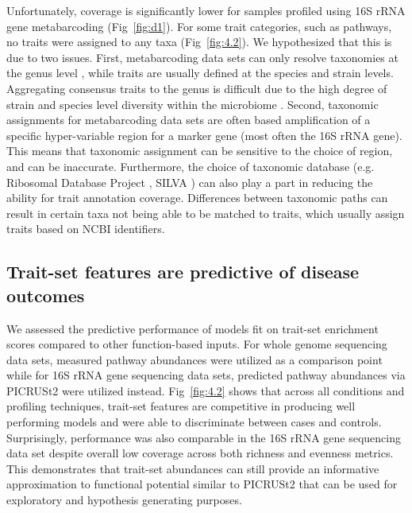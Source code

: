 Unfortunately, coverage is significantly lower for samples profiled using 16S rRNA gene metabarcoding (Fig~\ref{fig:d1}). For some trait categories, such as pathways, no traits were assigned to any taxa (Fig~\ref{fig:4.2}). We hypothesized that this is due to two issues. First, metabarcoding data sets can only resolve taxonomies at the genus level \cite{johnson2019evaluation}, while traits are usually defined at the species and strain levels. Aggregating consensus traits to the genus is difficult due to the high degree of strain and species level diversity within the microbiome \cite{carrow2020strain}. Second, taxonomic assignments for metabarcoding data sets are often based amplification of a specific hyper-variable region for a marker gene (most often the 16S rRNA gene). This means that taxonomic assignment can be sensitive to the choice of region, and can be inaccurate. Furthermore, the choice of taxonomic database (e.g. Ribosomal Database Project \cite{cole2014ribosomal}, SILVA \cite{quast2013silva}) can also play a part in reducing the ability for trait annotation coverage. Differences between taxonomic paths \cite{balvociute2017silva} can result in certain taxa not being able to be matched to traits, which usually assign traits based on NCBI identifiers.  

\subsection{Trait-set features are predictive of disease outcomes}

We assessed the predictive performance of models fit on trait-set enrichment scores compared to other function-based inputs. For whole genome sequencing data sets, measured pathway abundances were utilized as a comparison point while for 16S rRNA gene sequencing data sets, predicted pathway abundances via PICRUSt2 were utilized instead. Fig~\ref{fig:4.2} shows that across all conditions and profiling techniques, trait-set features are competitive in producing well performing models and were able to discriminate between cases and controls. Surprisingly, performance was also comparable in the 16S rRNA gene sequencing data set despite overall low coverage across both richness and evenness metrics. This demonstrates that trait-set abundances can still provide an informative approximation to functional potential similar to PICRUSt2 that can be used for exploratory and hypothesis generating purposes.   

